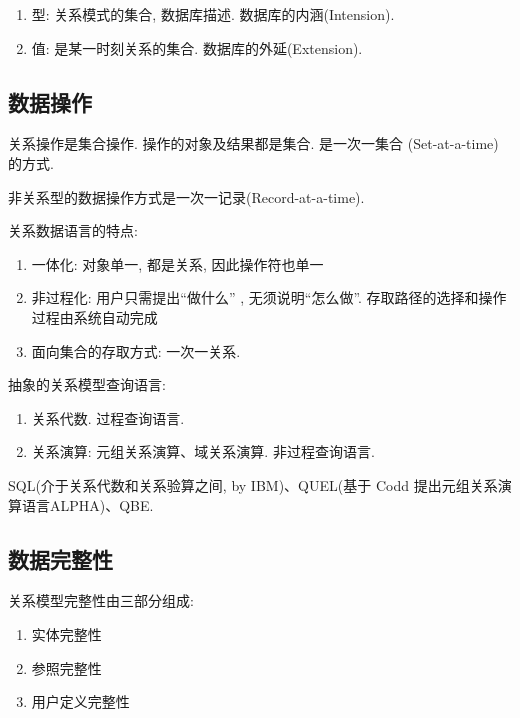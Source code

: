 \begin{definition}[关系型数据库]
\begin{enumerate}
    \item 型: 关系模式的集合, 数据库描述. 数据库的内涵(Intension).
    \item 值: 是某一时刻关系的集合. 数据库的外延(Extension).
\end{enumerate}
\end{definition}

\subsection{数据操作}

关系操作是集合操作. 操作的对象及结果都是集合. 是一次一集合 (Set-at-a-time)的方式.

非关系型的数据操作方式是一次一记录(Record-at-a-time).

关系数据语言的特点:
\begin{enumerate}
    \item 一体化: 对象单一, 都是关系, 因此操作符也单一
    \item 非过程化: 用户只需提出“做什么” , 无须说明“怎么做”. 存取路径的选择和操作过程由系统自动完成
    \item 面向集合的存取方式: 一次一关系.
\end{enumerate}

抽象的关系模型查询语言:
\begin{enumerate}
    \item 关系代数. 过程查询语言.
    \item 关系演算: 元组关系演算、域关系演算. 非过程查询语言.
\end{enumerate}

SQL(介于关系代数和关系验算之间, by IBM)、QUEL(基于 Codd 提出元组关系演算语言ALPHA)、QBE.

\subsection{数据完整性}

\begin{definition}[关系模型完整性]
关系模型完整性由三部分组成:
\begin{enumerate}
    \item 实体完整性
    \item 参照完整性
    \item 用户定义完整性
\end{enumerate}
\end{definition}

